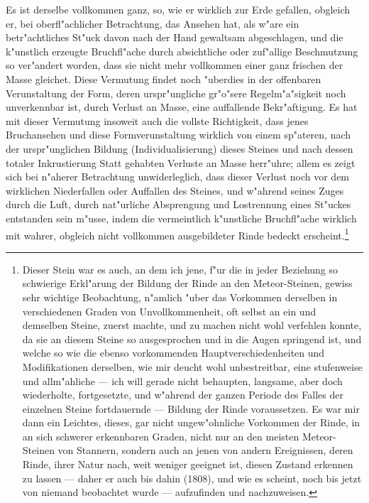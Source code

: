 \documentclass[a4paper, 11pt, oneside, german]{article}
\begin{document}
Es ist derselbe vollkommen ganz, so, wie er wirklich zur Erde gefallen, obgleich er, bei oberfl"achlicher Betrachtung, das Ansehen hat, als w"are ein betr"achtliches St"uck davon nach der Hand gewaltsam abgeschlagen, und die k"unstlich erzeugte Bruchfl"ache durch absichtliche oder zuf"allige Beschmutzung so ver"andert worden, dass sie nicht mehr vollkommen einer ganz frischen der Masse gleichet. Diese Vermutung findet noch "uberdies in der offenbaren Verunstaltung der Form, deren urspr"ungliche gr"o"sere Regelm"a"sigkeit noch unverkennbar ist, durch Verlust an Masse, eine auffallende Bekr"aftigung. Es hat mit dieser Vermutung insoweit auch die vollste Richtigkeit, dass jenes Bruchansehen und diese Formverunstaltung wirklich von einem sp"ateren, nach der urspr"unglichen Bildung (Individualisierung) dieses Steines und nach dessen totaler Inkrustierung Statt gehabten Verluste an Masse herr"uhre; allem es zeigt sich bei n"aherer Betrachtung unwiderleglich, dass dieser Verlust noch vor dem wirklichen Niederfallen oder Auffallen des Steines, und w"ahrend seines Zuges durch die Luft, durch nat"urliche Absprengung und Lostrennung eines St"uckes entstanden sein m"usse, indem die vermeintlich k"unstliche Bruchfl"ache wirklich mit wahrer, obgleich nicht vollkommen ausgebildeter Rinde bedeckt erscheint.\footnote{Dieser Stein war es auch, an dem ich jene, f"ur die in jeder Beziehung so schwierige Erkl"arung der Bildung der Rinde an den Meteor-Steinen, gewiss sehr wichtige Beobachtung, n"amlich "uber das Vorkommen derselben in verschiedenen Graden von Unvollkommenheit, oft selbst an ein und demselben Steine, zuerst machte, und zu machen nicht wohl verfehlen konnte, da sie an diesem Steine so ausgesprochen und in die Augen springend ist, und welche so wie die ebenso vorkommenden Hauptverschiedenheiten und Modifikationen derselben, wie mir deucht wohl unbestreitbar, eine stufenweise und allm"ahliche --- ich will gerade nicht behaupten, langsame, aber doch wiederholte, fortgesetzte, und w"ahrend der ganzen Periode des Falles der einzelnen Steine fortdauernde --- Bildung der Rinde voraussetzen. Es war mir dann ein Leichtes, dieses, gar nicht ungew"ohnliche Vorkommen der Rinde, in an sich schwerer erkennbaren Graden, nicht nur an den meisten Meteor-Steinen von Stannern, sondern auch an jenen von andern Ereignissen, deren Rinde, ihrer Natur nach, weit weniger geeignet ist, diesen Zustand erkennen zu lassen --- daher er auch bis dahin (1808), und wie es scheint, noch bis jetzt von niemand beobachtet wurde --- aufzufinden und nachzuweisen.}
\end{document}
